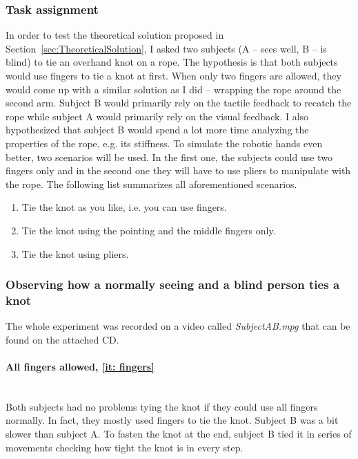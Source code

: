         \subsubsection{Task assignment}
            In order to test the theoretical solution proposed in Section~\ref{sec:TheoreticalSolution}, I asked two subjects (A -- sees well, B -- is blind) to tie an overhand knot on a rope. The hypothesis is that both subjects would use fingers to tie a knot at first. When only two fingers are allowed, they would come up with a similar solution as I did -- wrapping the rope around the second arm. Subject B would primarily rely on the tactile feedback to recatch the rope while subject A would primarily rely on the visual feedback. I also hypothesized that subject B would spend a lot more time analyzing the properties of the rope, e.g. its stiffness. To simulate the robotic hands even better, two scenarios will be used. In the first one, the subjects could use two fingers only and in the second one they will have to use pliers to manipulate with the rope. The following list summarizes all aforementioned scenarios.
%
            \begin{enumerate}\itemsep0pt
                \item Tie the knot as you like, i.e. you can use fingers. \label{it: fingers}
                \item Tie the knot using the pointing and the middle fingers only. \label{it: 2 fingers only}
                \item Tie the knot using pliers. \label{it: pliers}
            \end{enumerate}

        \subsubsection{Observing how a normally seeing and a blind person ties a knot}

            The whole experiment was recorded on a video called \textit{SubjectAB.mpg} that can be found on the attached CD.

            \paragraph{All fingers allowed, \ref{it: fingers}}~\\
                \indent Both subjects had no problems tying the knot if they could use all fingers normally. In fact, they mostly used fingers to tie the knot. Subject B was a bit slower than subject A. To fasten the knot at the end, subject B tied it in series of movements checking how tight the knot is in every step.

